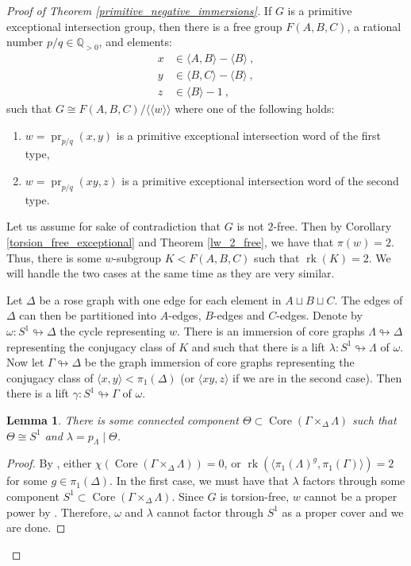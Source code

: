 \documentclass[11pt, a4paper]{amsart}
\newtheorem{lemma}[theorem]{Lemma}
\theoremstyle{definition}
\newcommand{\isom}{\cong}
\newcommand{\Q}{\mathbb{Q}}
\newcommand{\normal}[1]{\langle\langle #1 \rangle\rangle}
\def\immerses{\looparrowright}
\DeclareMathOperator{\rk}{rk}
\DeclareMathOperator{\pr}{pr}
\DeclareMathOperator{\core}{Core}
\newcounter{cases}
\begin{document}
\begin{proof}[Proof of Theorem \ref{primitive_negative_immersions}]
If $G$ is a primitive exceptional intersection group, then there is a free group $F(A, B, C)$, a rational number $p/q\in \Q_{>0}$, and elements:
\begin{align*}
x &\in \langle A, B\rangle - \langle B\rangle~,\\
y &\in \langle B, C\rangle - \langle B\rangle~,\\
z &\in \langle B\rangle - 1~,
\end{align*}
such that $G\isom F(A, B, C)/\normal{w}$ where one of the following holds:
\begin{enumerate}
\item $w = \pr_{p/q}(x, y)$ is a primitive exceptional intersection word of the first type,
\item $w = \pr_{p/q}(xy, z)$ is a primitive exceptional intersection word of the second type.
\end{enumerate}
Let us assume for sake of contradiction that $G$ is not $2$-free. Then by Corollary \ref{torsion_free_exceptional} and Theorem \ref{lw_2_free}, we have that $\pi(w) = 2$. Thus, there is some $w$-subgroup $K<F(A, B, C)$ such that $\rk(K) = 2$. We will handle the two cases at the same time as they are very similar. 

Let $\Delta$ be a rose graph with one edge for each element in $A\sqcup B\sqcup C$. The edges of $\Delta$ can then be partitioned into $A$-edges, $B$-edges and $C$-edges. Denote by $\omega:S^1\immerses \Delta$ the cycle representing $w$. There is an immersion of core graphs $\Lambda\immerses \Delta$ representing the conjugacy class of $K$ and such that there is a lift $\lambda:S^1\immerses \Lambda$ of $\omega$. Now let $\Gamma\immerses \Delta$ be the graph immersion of core graphs representing the conjugacy class of $\langle x, y\rangle<\pi_1(\Delta)$ (or $\langle xy, z\rangle$ if we are in the second case). Then there is a lift $\gamma:S^1\immerses \Gamma$ of $\omega$.


\begin{lemma}
\label{rank_1_pullback_2}
There is some connected component $\Theta\subset \core(\Gamma\times_{\Delta}\Lambda)$ such that $\Theta \isom S^1$ and $\lambda = p_{\Lambda}\mid\Theta$.
\end{lemma}

\begin{proof}
By \cite[Theorem 1]{kent_09}, either $\chi(\core(\Gamma\times_{\Delta}\Lambda)) = 0$, or $\rk(\langle \pi_1(\Lambda)^g,\pi_1(\Gamma)\rangle) = 2$ for some $g\in \pi_1(\Delta)$. In the first case, we must have that $\lambda$ factors through some component $S^1\subset \core(\Gamma\times_{\Delta}\Lambda)$. Since $G$ is torsion-free, $w$ cannot be a proper power by \cite{karrass_60}. Therefore, $\omega$ and $\lambda$ cannot factor through $S^1$ as a proper cover and we are done.


\end{proof}
\end{proof}
\end{document}
